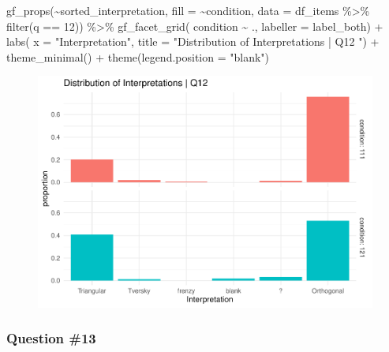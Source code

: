 \documentclass[
  letterpaper,
  DIV=11,
  numbers=noendperiod]{scrreprt}
\newenvironment{Shaded}{\begin{snugshade}}{\end{snugshade}}
\newcommand{\AttributeTok}[1]{\textcolor[rgb]{0.40,0.45,0.13}{#1}}
\newcommand{\DecValTok}[1]{\textcolor[rgb]{0.68,0.00,0.00}{#1}}
\newcommand{\FunctionTok}[1]{\textcolor[rgb]{0.28,0.35,0.67}{#1}}
\newcommand{\NormalTok}[1]{\textcolor[rgb]{0.00,0.23,0.31}{#1}}
\newcommand{\SpecialCharTok}[1]{\textcolor[rgb]{0.37,0.37,0.37}{#1}}
\newcommand{\StringTok}[1]{\textcolor[rgb]{0.13,0.47,0.30}{#1}}
\begin{document}
\begin{Shaded}
\begin{Highlighting}[]
\FunctionTok{gf\_props}\NormalTok{(}\SpecialCharTok{\textasciitilde{}}\NormalTok{sorted\_interpretation, }\AttributeTok{fill =} \SpecialCharTok{\textasciitilde{}}\NormalTok{condition, }\AttributeTok{data =}\NormalTok{ df\_items }\SpecialCharTok{\%\textgreater{}\%} \FunctionTok{filter}\NormalTok{(q }\SpecialCharTok{==} \DecValTok{12}\NormalTok{)) }\SpecialCharTok{\%\textgreater{}\%} 
  \FunctionTok{gf\_facet\_grid}\NormalTok{( condition }\SpecialCharTok{\textasciitilde{}}\NormalTok{ ., }\AttributeTok{labeller =}\NormalTok{ label\_both) }\SpecialCharTok{+} 
  \FunctionTok{labs}\NormalTok{( }\AttributeTok{x =} \StringTok{"Interpretation"}\NormalTok{, }\AttributeTok{title =} \StringTok{"Distribution of Interpretations | Q12 "}\NormalTok{) }\SpecialCharTok{+} 
  \FunctionTok{theme\_minimal}\NormalTok{() }\SpecialCharTok{+} \FunctionTok{theme}\NormalTok{(}\AttributeTok{legend.position =} \StringTok{"blank"}\NormalTok{)}
\end{Highlighting}
\end{Shaded}

\begin{figure}[H]

{\centering \includegraphics{analysis/SGC3A/2_sgc3A_scoring_files/figure-pdf/Q12-distribution-2.pdf}

}

\end{figure}

\hypertarget{question-13}{%
\subsubsection{Question \#13}\label{question-13}}
\end{document}
